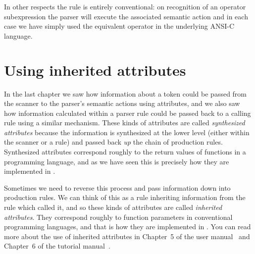 In other respects the rule is entirely conventional: on recognition of an operator 
subexpression the parser will execute the associated semantic action and in each case
we have simply used the equivalent operator in the underlying ANSI-C language.

\section{Using inherited attributes} In the last chapter we saw how
information about a token could be passed from the scanner to the
parser's semantic actions using attributes, and we also saw how
information calculated within a parser rule could be passed back to a
calling rule using a similar mechanism. These kinds of attributes are
called  {\em synthesized attributes} because the information is
synthesized at the lower level (either within the scanner or a rule) and
passed back {\em up} the chain of production rules. Synthesized
attributes correspond roughly to the return values of functions in a
programming language, and as we have seen this is precisely how they are
implemented in \rdp.

Sometimes we need to reverse this process and pass information down into
production rules. We can think of this as a rule inheriting information
from the rule which called it, and so these kinds of attributes are
called {\em inherited attributes}. They correspond roughly to function
parameters in conventional programming languages, and that is how they
are implemented in \rdp. You can read more about the use of inherited attributes in
Chapter~5 of the user manual~\cite{rdp:user:1.5} and Chapter~6 of the tutorial
manual~\cite{rdp:tut:1.5}.

